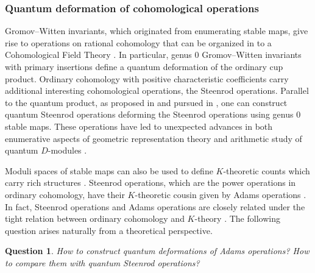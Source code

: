 \documentclass[reqno]{amsart}
\numberwithin{equation}{section}
\numberwithin{equation}{section}
\numberwithin{equation}{section}
\newtheorem{ques}[thm]{Question}
\theoremstyle{definition}
\theoremstyle{remark}
\theoremstyle{remark}
\begin{document}
\subsubsection{Quantum deformation of cohomological operations}
Gromov--Witten invariants, which originated from enumerating stable maps, give rise to operations on rational cohomology that can be organized in to a Cohomological Field Theory \cite{kontsevich-manin}. In particular, genus $0$ Gromov--Witten invariants with primary insertions define a quantum deformation of the ordinary cup product. Ordinary cohomology with positive characteristic coefficients carry additional interesting cohomological operations, the Steenrod operations. Parallel to the quantum product, as proposed in \cite{Fuk97} and pursued in \cite{Wil20, seidel-wilkins}, one can construct quantum Steenrod operations deforming the Steenrod operations using genus $0$ stable maps. These operations have led to unexpected advances in both enumerative aspects of geometric representation theory \cite{Lee23b,bai-lee} and arithmetic study of quantum $D$-modules \cite{chen2024exponential}.

Moduli spaces of stable maps can also be used to define $K$-theoretic counts which carry rich structures \cite{givental-lee,lee-K}. Steenrod operations, which are the power operations in ordinary cohomology, have their $K$-theoretic cousin given by Adams operations \cite{adams}. In fact, Steenrod operations and Adams operations are closely related under the tight relation between ordinary cohomology and $K$-theory \cite{atiyah-power}. The following question arises naturally from a theoretical perspective.

\begin{ques}
    How to construct quantum deformations of Adams operations? How to compare them with quantum Steenrod operations?
\end{ques}
\end{document}
